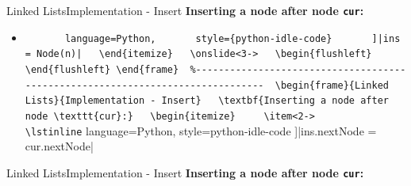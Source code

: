 
\begin{frame}{Linked Lists}{Implementation - Insert}
  \textbf{Inserting a node after node \texttt{cur}:}
  \begin{itemize}
    \item<2->
      \lstinline[
      language=Python,
      style={python-idle-code}
      ]|ins = Node(n)|
  \end{itemize}
  \onslide<3->
  \begin{flushleft}
    
  \end{flushleft}
\end{frame}


\begin{frame}{Linked Lists}{Implementation - Insert}
  \textbf{Inserting a node after node \texttt{cur}:}
  \begin{itemize}
    \item<2->
      \lstinline[
        language=Python,
        style={python-idle-code}
      ]|ins.nextNode = cur.nextNode|
  \end{itemize}
  \begin{flushleft}
    
  \end{flushleft}
\end{frame}


\begin{frame}{Linked Lists}{Implementation - Insert}
  \textbf{Inserting a node after node \texttt{cur}:}
  \begin{flushleft}
    
  \end{flushleft}
\end{frame}


